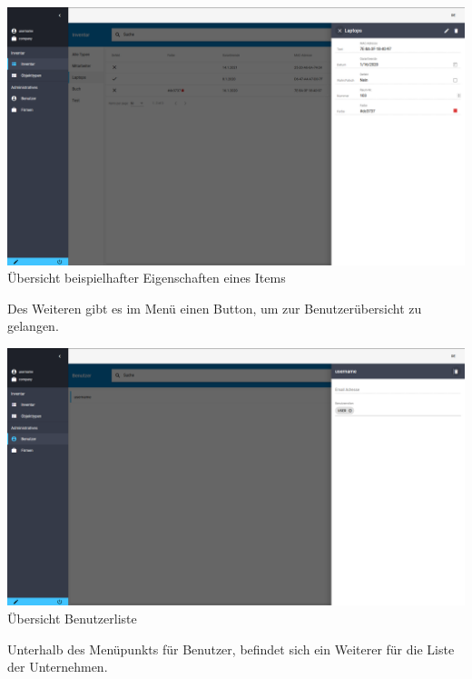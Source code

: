 \documentclass[11pt,a4paper]{report}
\begin{document}
	\begin{center}
		\includegraphics[scale=0.3]{Item-Details.png}\\
		Übersicht beispielhafter Eigenschaften eines Items\\
	\end{center}
	
	Des Weiteren gibt es im Menü einen Button, um zur Benutzerübersicht zu gelangen.\\
	
	\begin{center}
		\includegraphics[scale=0.3]{User.png}\\
		Übersicht Benutzerliste\\
	\end{center}
	
	Unterhalb des Menüpunkts für Benutzer, befindet sich ein Weiterer für die Liste der Unternehmen.
	
\end{document}

